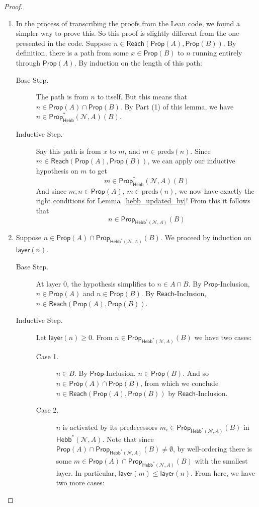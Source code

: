 \documentclass[letterpaper]{article}
\theoremstyle{definition}
\newcommand{\preds}[1]{\mbox{preds}(#1)}
\newcommand{\layer}[1]{\mathsf{layer}(#1)}
\newcommand{\Net}{\mathcal{N}}
\newcommand{\Prop}{\textsf{Prop}}
\newcommand{\Reach}{\textsf{Reach}}
\newcommand{\Hebbstar}[2]{\textsf{Hebb}^*(#1, #2)}
\begin{document}
\begin{proof}
\begin{enumerate}
        \item 
        In the process of transcribing the proofs from the Lean code, we found a simpler way to prove this.  So this proof is slightly different from the one presented in the code.  Suppose $n \in \Reach(\Prop(A), \Prop(B))$.  By definition, there is a path from some $x \in \Prop(B)$ to $n$ running entirely through $\Prop(A)$.  By induction on the length of this path:
        \begin{description}
            \item[Base Step.] The path is from $n$ to itself.  But this means that $n \in \Prop(A) \cap \Prop(B)$.  By Part (1) of this lemma, we have $n \in \Prop_\Hebbstar{\Net}{A}(B)$.

            \item[Inductive Step.] Say this path is from $x$ to $m$, and $m \in \preds{n}$.  Since $m \in \Reach(\Prop(A), \Prop(B))$, we can apply our inductive hypothesis on $m$ to get
            \[
                m \in \Prop_\Hebbstar{\Net}{A}(B)
            \]
            And since $m, n \in \Prop(A)$, $m \in \preds{n}$, we now have exactly the right conditions for Lemma~\ref{hebb_updated_by}!  From this it follows that
            \[
                n \in \Prop_{\Hebbstar{\Net}{A}}(B)
            \]
        \end{description}

        \item 
        Suppose $n \in \Prop(A) \cap \Prop_{\Hebbstar{\Net}{A}}(B)$.  We proceed by induction on $\layer{n}$.
        \begin{description}
            \item[Base Step.] At layer $0$, the hypothesis simplifies to $n \in A \cap B$.  By $\Prop$-Inclusion, $n \in \Prop(A)$ and $n \in \Prop(B)$.  By $\Reach$-Inclusion, $n \in \Reach(\Prop(A), \Prop(B))$.
           
            \item[Inductive Step.] Let $\layer{n} \geq 0$.
            From $n \in \Prop_{\Hebbstar{\Net}{A}}(B)$ we have two cases:
            \begin{description}
                \item[Case 1.] $n \in B$.  By $\Prop$-Inclusion, $n \in \Prop(B)$.  And so $n \in \Prop(A) \cap \Prop(B)$, from which we conclude $n \in \Reach(\Prop(A), \Prop(B))$ by $\Reach$-Inclusion.
                
                \item[Case 2.] $n$ is activated by its predecessors $m_i \in \Prop_{\Hebbstar{\Net}{A}}(B)$ in $\Hebbstar{\Net}{A}$.  Note that since $\Prop(A) \cap \Prop_{\Hebbstar{\Net}{A}}(B) \not = \emptyset$, by well-ordering there is some $m \in \Prop(A) \cap \Prop_{\Hebbstar{\Net}{A}}(B)$ with the smallest layer.  In particular, $\layer{m} \leq \layer{n}$.  From here, we have two more cases:


\end{description}
\end{description}
\end{enumerate}
\end{proof}
\end{document}
